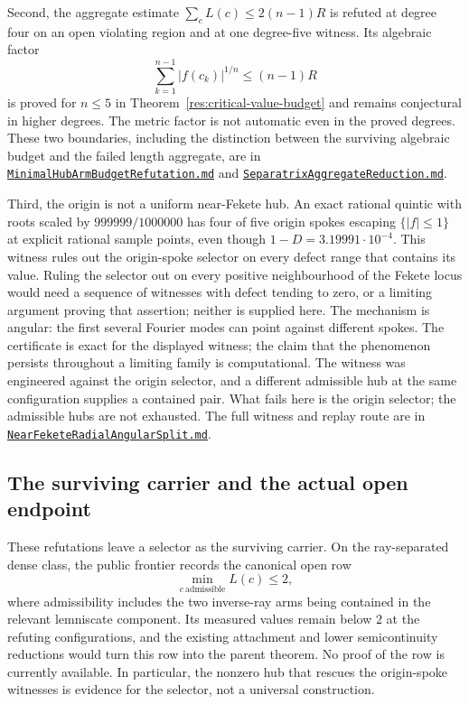 \documentclass[11pt]{article}
\begin{document}
Second, the aggregate estimate
$\sum_cL(c)\le2(n-1)R$ is refuted at degree four on an open violating region
and at one degree-five witness.  Its algebraic factor
\[
 \sum_{k=1}^{n-1}|f(c_k)|^{1/n}\le(n-1)R
\]
is proved for $n\le5$ in Theorem~\ref{res:critical-value-budget} and remains
conjectural in higher degrees.  The metric factor is not automatic even in
the proved degrees.
These two boundaries, including the distinction between the surviving
algebraic budget and the failed length aggregate, are in
\href{https://github.com/wcook04/plectis-erdos/blob/f214a6b45528dc5eefe20ffadc35f2e981627d4c/research_corpus/Erdos1041/MinimalHubArmBudgetRefutation.md}{\texttt{MinimalHubArmBudgetRefutation.md}}
and
\href{https://github.com/wcook04/plectis-erdos/blob/f214a6b45528dc5eefe20ffadc35f2e981627d4c/research_corpus/Erdos1041/SeparatrixAggregateReduction.md}{\texttt{SeparatrixAggregateReduction.md}}.

Third, the origin is not a uniform near-Fekete hub.  An exact rational
quintic with roots scaled by $999999/1000000$ has four of five origin spokes
escaping $\{|f|\le1\}$ at explicit rational sample points, even though
$1-D=3.19991\cdot10^{-4}$.  This witness rules out the origin-spoke selector
on every defect range that contains its value.  Ruling the selector out on
every positive neighbourhood of the Fekete locus would need a sequence of
witnesses with defect tending to zero, or a limiting argument proving that
assertion; neither is supplied here.  The mechanism is angular: the first
several Fourier modes can point against different spokes.  The certificate is
exact for the displayed witness; the claim that the phenomenon persists
throughout a limiting family is computational.  The witness was engineered
against the origin selector, and a different admissible hub at the same
configuration supplies a contained pair.  What fails here is the origin
selector; the admissible hubs are not exhausted.  The full witness and replay route are in
\href{https://github.com/wcook04/plectis-erdos/blob/f214a6b45528dc5eefe20ffadc35f2e981627d4c/research_corpus/Erdos1041/NearFeketeRadialAngularSplit.md}{\texttt{NearFeketeRadialAngularSplit.md}}.

\subsection*{The surviving carrier and the actual open endpoint}

These refutations leave a selector as the surviving carrier.  On the
ray-separated dense class, the public frontier records the canonical open row
\[
  \min_{c\ \mathrm{admissible}} L(c)\le2,
\]
where admissibility includes the two inverse-ray arms being contained in the
relevant lemniscate component.  Its measured values remain below $2$ at the
refuting configurations, and the existing attachment and lower
semicontinuity reductions would turn this row into the parent theorem.  No
proof of the row is currently available.  In particular, the nonzero hub
that rescues the origin-spoke witnesses is evidence for the selector, not a
universal construction.
\end{document}
